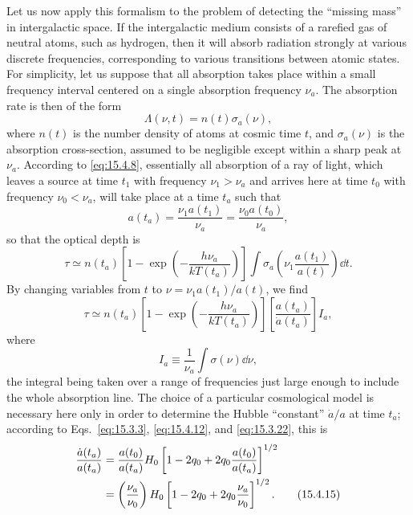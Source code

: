 Let us now apply this formalism to the problem of detecting the ``missing
mass'' in intergalactic space. If the intergalactic medium consists of a
rarefied gas of neutral atoms, such as hydrogen, then it will absorb radiation
strongly at various discrete frequencies, corresponding to various transitions
between atomic states. For simplicity, let us suppose that all absorption takes
place within a small frequency interval centered on a single absorption
frequency \(\nu_a\). The absorption rate is then of the form
\[
  \Lambda(\nu,t)=n(t)\sigma_a(\nu),
\]
where \(n(t)\) is the number density of atoms at cosmic time \(t\), and
\(\sigma_a(\nu)\) is the absorption cross-section, assumed to be negligible
except within a sharp peak at \(\nu_a\). According to \eqref{eq:15.4.8},
essentially all absorption of a ray of light, which leaves a source at time
\(t_1\) with frequency \(\nu_1>\nu_a\) and arrives here at time \(t_0\) with
frequency \(\nu_0<\nu_a\), will take place at a time \(t_a\) such that
\begin{equation}
  a(t_a)
  =
  \frac{\nu_1a(t_1)}{\nu_a}
  =
  \frac{\nu_0a(t_0)}{\nu_a},
  \tag{15.4.12}\label{eq:15.4.12}
\end{equation}
so that the optical depth is
\[
  \tau
  \simeq
  n(t_a)
  \left[
    1-\exp\left(-\frac{h\nu_a}{kT(t_a)}\right)
  \right]
  \int
  \sigma_a\left(\nu_1\frac{a(t_1)}{a(t)}\right)\dd t.
\]
By changing variables from \(t\) to
\(\nu=\nu_1a(t_1)/a(t)\), we find
\begin{equation}
  \tau
  \simeq
  n(t_a)
  \left[
    1-\exp\left(-\frac{h\nu_a}{kT(t_a)}\right)
  \right]
  \left[\frac{a(t_a)}{\dot a(t_a)}\right]I_a,
  \tag{15.4.13}\label{eq:15.4.13}
\end{equation}
where
\begin{equation}
  I_a\equiv\frac1{\nu_a}\int\sigma(\nu)\dd\nu,
  \tag{15.4.14}\label{eq:15.4.14}
\end{equation}
the integral being taken over a range of frequencies just large enough to
include the whole absorption line. The choice of a particular cosmological
model is necessary here only in order to determine the Hubble ``constant''
\(\dot a/a\) at time \(t_a\); according to Eqs.~\eqref{eq:15.3.3},
\eqref{eq:15.4.12}, and \eqref{eq:15.3.22}, this is
\begin{align}
  \frac{\dot a(t_a)}{a(t_a)}
  &=
  \frac{a(t_0)}{a(t_a)}H_0
  \left[
    1-2q_0+2q_0\frac{a(t_0)}{a(t_a)}
  \right]^{1/2}
  \notag\\
  &=
  \left(\frac{\nu_a}{\nu_0}\right)H_0
  \left[
    1-2q_0+2q_0\frac{\nu_a}{\nu_0}
  \right]^{1/2}.
  \tag{15.4.15}\label{eq:15.4.15}
\end{align}
